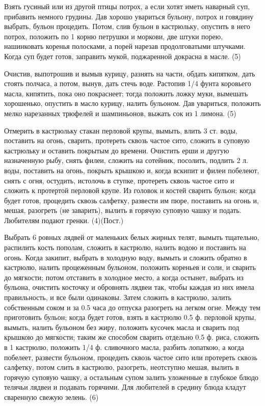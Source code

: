 
Взять гусиный или из другой птицы потрох, а если хотят иметь наварный суп, прибавить немного грудины. Дав хорошо увариться бульону, потрох и говядину выбрать, бульон процедить. Потом, слив бульон в кастрюльку, опустить в него потрох, положить по 1 корню петрушки и моркови, две штуки порею, нашинковать коренья полосками, а порей нарезав продолговатыми штучками. Когда суп будет готов, заправить мукой, поджаренной докрасна в масле. (5)


Очистив, выпотрошив и вымыв курицу, разнять на части, обдать кипятком, дать стоять полчаса, а потом, вынув, дать стечь воде. Растопив 1/4 фунта коровьего масла, кипятить, пока оно покраснеет; тогда положить ложку муки, вымешать хорошенько, опустить в масло курицу, налить бульоном. Дав увариться, положить мелко нарезанных трюфелей и шампиньонов, выжать сок из 1 лимона. (5)


Отмерить в кастрюльку стакан перловой крупы, вымыть, влить 3 ст. воды, поставить на огонь, сварить, протереть сквозь частое сито, сложить в суповую кастрюльку и оставить покрытым до времени. Очистить ерши и другую назначенную рыбу, снять филеи, сложить на сотейник, посолить, подлить 2 л. воды, поставить на огонь, покрыть крышкою и, когда вскипит и филеи побелеют, снять с огня, остудить, истолочь в ступке, протереть сквозь частое сито и сложить к протертой перловой крупе. Из головок и костей сварить бульон; когда будет готов, процедить сквозь салфетку, развести им пюре, поставить на огонь и, мешая, разогреть (не заварить), вылить в горячую суповую чашку и подать. Любителям подают гренки. (4)(Пост.)


Выбрать 6 ровных лядвей от маленьких белых жирных телят, вымыть тщательно, распилить кость пополам, сложить в кастрюлю, налить водою и поставить на огонь. Когда закипит, выбрать в холодную воду, вымыть и сложить обратно в кастрюлю, налить процеженным бульоном, положить кореньев и соли, и сварить до мягкости; потом отставить в холодное место, а когда остынет, выбрать из бульона, очистить косточку и обровнять лядвеи так, чтобы каждая из них имела правильность, и все были одинаковы. Затем сложить в кастрюлю, залить собственным соком и за 0.5 часа до отпуска разогреть на легком огне. Между тем приготовить бульон; когда будет готов, взять в кастрюлю 0.5 ф. перловой крупы, вымыть, налить бульоном без жиру, положить кусочек масла и сварить под крышкою до мягкости; таким же способом сварить отдельно 0.5 ф. риса, сложить в 1 кастрюлю, положить 1/4 ф. сливочного масла, разбить лопаткою, а когда побелеет, развести бульоном, процедить сквозь частое сито или протереть сквозь салфетку, потом слить в кастрюлю, разогреть, неотступно мешая, вылить в горячую суповую чашку, а остальным супом залить уложенные в глубокое блюдо телячьи лядвеи и подавать горячими. Для любителей в средину блюда кладут сваренную свежую зелень. (6)

